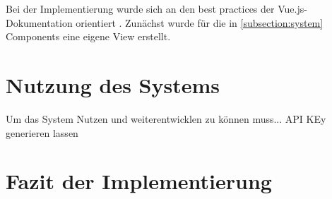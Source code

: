 Bei der Implementierung wurde sich an den best practices der
Vue.js-Dokumentation orientiert . Zunächst wurde für die
in \ref{subsection:system} Components eine eigene View erstellt.


\section{Nutzung des Systems}
Um das System Nutzen und weiterentwicklen zu können muss...
API KEy generieren lassen

\section{Fazit der Implementierung}